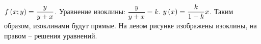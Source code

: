 \documentclass[a5paper,10pt]{article}
\begin{document}
$f\left(\hspace{0.01em}x; y\hspace{0.01em}\right) = \dfrac {y} {y + x}$.
Уравнение изоклины: $\dfrac {y} {y + x} = k$. $y\left(\hspace{0.01em}x\hspace{0.01em}\right) = \dfrac {k} {1 - k} x$.
Таким образом, изоклинами будут прямые. 
На левом рисунке изображены изоклины, на правом -- решения уравнений.

%            
%            
\end{document}
